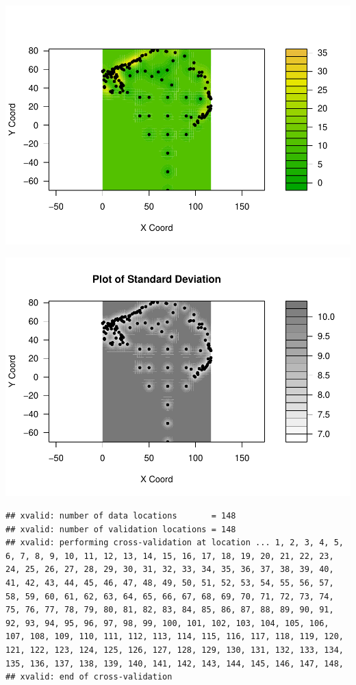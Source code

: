 \documentclass[
]{article}
\begin{document}
\includegraphics{Assignment_1_files/figure-latex/unnamed-chunk-46-1.pdf}

\includegraphics{Assignment_1_files/figure-latex/unnamed-chunk-47-1.pdf}

\begin{verbatim}
## xvalid: number of data locations       = 148
## xvalid: number of validation locations = 148
## xvalid: performing cross-validation at location ... 1, 2, 3, 4, 5, 6, 7, 8, 9, 10, 11, 12, 13, 14, 15, 16, 17, 18, 19, 20, 21, 22, 23, 24, 25, 26, 27, 28, 29, 30, 31, 32, 33, 34, 35, 36, 37, 38, 39, 40, 41, 42, 43, 44, 45, 46, 47, 48, 49, 50, 51, 52, 53, 54, 55, 56, 57, 58, 59, 60, 61, 62, 63, 64, 65, 66, 67, 68, 69, 70, 71, 72, 73, 74, 75, 76, 77, 78, 79, 80, 81, 82, 83, 84, 85, 86, 87, 88, 89, 90, 91, 92, 93, 94, 95, 96, 97, 98, 99, 100, 101, 102, 103, 104, 105, 106, 107, 108, 109, 110, 111, 112, 113, 114, 115, 116, 117, 118, 119, 120, 121, 122, 123, 124, 125, 126, 127, 128, 129, 130, 131, 132, 133, 134, 135, 136, 137, 138, 139, 140, 141, 142, 143, 144, 145, 146, 147, 148, 
## xvalid: end of cross-validation
\end{verbatim}
\end{document}
